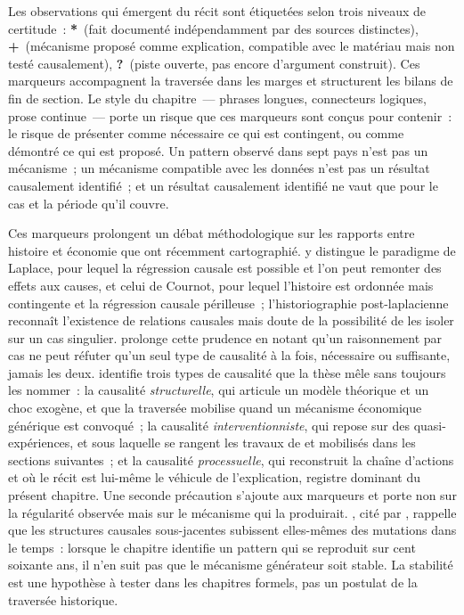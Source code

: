 Les observations qui émergent du récit sont étiquetées selon trois niveaux de certitude~: \textbf{*}~(fait documenté indépendamment par des sources distinctes), \textbf{+}~(mécanisme proposé comme explication, compatible avec le matériau mais non testé causalement), \textbf{?}~(piste ouverte, pas encore d'argument construit). Ces marqueurs accompagnent la traversée dans les marges et structurent les bilans de fin de section. Le style du chapitre~--- phrases longues, connecteurs logiques, prose continue~--- porte un risque que ces marqueurs sont conçus pour contenir~: le risque de présenter comme nécessaire ce qui est contingent, ou comme démontré ce qui est proposé. Un pattern observé dans sept pays n'est pas un mécanisme~; un mécanisme compatible avec les données n'est pas un résultat causalement identifié~; et un résultat causalement identifié ne vaut que pour le cas et la période qu'il couvre.

Ces marqueurs prolongent un débat méthodologique sur les rapports entre histoire et économie que \textcite{trannoy_economistes_2025} ont récemment cartographié. \textcite{grenier_causalite_2025} y distingue le paradigme de Laplace, pour lequel la régression causale est possible et l'on peut remonter des effets aux causes, et celui de Cournot, pour lequel l'histoire est ordonnée mais contingente et la régression causale périlleuse~; l'historiographie post-laplacienne reconnaît l'existence de relations causales mais doute de la possibilité de les isoler sur un cas singulier. \textcite{trannoy_causalite_2025} prolonge cette prudence en notant qu'un raisonnement par cas ne peut réfuter qu'un seul type de causalité à la fois, nécessaire ou suffisante, jamais les deux. \textcite{monnet_perspectives_2025} identifie trois types de causalité que la thèse mêle sans toujours les nommer~: la causalité \emph{structurelle}, qui articule un modèle théorique et un choc exogène, et que la traversée mobilise quand un mécanisme économique générique est convoqué~; la causalité \emph{interventionniste}, qui repose sur des quasi-expériences, et sous laquelle se rangent les travaux de \textcite{steinwender_real_2018} et \textcite{juhasz_spinning_2018} mobilisés dans les sections suivantes~; et la causalité \emph{processuelle}, qui reconstruit la chaîne d'actions et où le récit est lui-même le véhicule de l'explication, registre dominant du présent chapitre. Une seconde précaution s'ajoute aux marqueurs et porte non sur la régularité observée mais sur le mécanisme qui la produirait. \textcite{sewell_logics_2005}, cité par \textcite{monnet_perspectives_2025}, rappelle que les structures causales sous-jacentes subissent elles-mêmes des mutations dans le temps~: lorsque le chapitre identifie un pattern qui se reproduit sur cent soixante ans, il n'en suit pas que le mécanisme générateur soit stable. La stabilité est une hypothèse à tester dans les chapitres formels, pas un postulat de la traversée historique.

